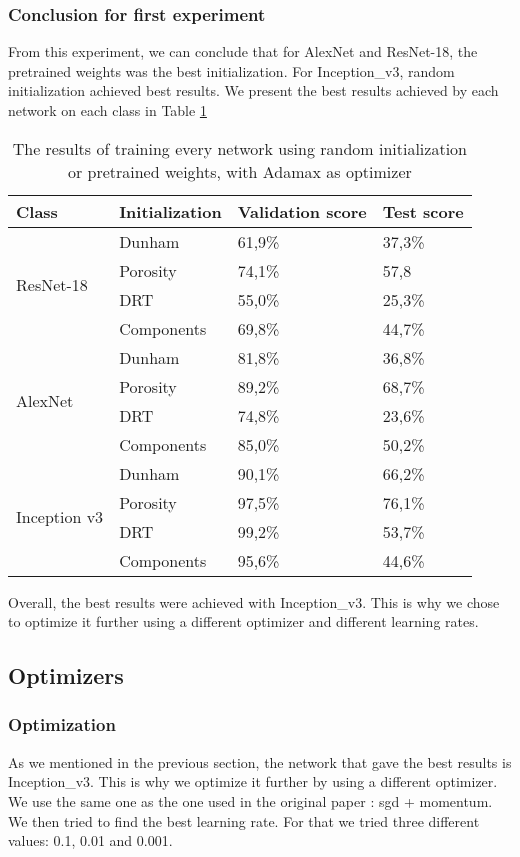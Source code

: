 \subsubsection{Conclusion for first experiment}
From this experiment, we can conclude that for AlexNet and ResNet-18, the pretrained weights was the best initialization. For Inception\_v3, random initialization achieved best results. We present the best results achieved by each network on each class in Table \ref{tab:finalinit}
\begin{table}
\caption[Best results for each network]{\label{tab:finalinit} The results of training every network using random initialization or pretrained weights, with Adamax as optimizer}
\centering
\begin{tabular}[b]{| l |  l | l | l |}
\hline
    Class & Initialization & Validation score  & Test score\\ \hline
    \multirow{4}{*}{ResNet-18} & Dunham &  61,9\%  & 37,3\% \\ 
    & Porosity & 74,1\% &  57,8\\
    &DRT & 55,0\% &  25,3\% \\
    &Components & 69,8\% &  44,7\% \\ \hline
     \multirow{4}{*}{AlexNet} & Dunham &  81,8\% & 36,8\% \\
    & Porosity & 89,2\% &  68,7\% \\
    &DRT & 74,8\% &   23,6\% \\
    &Components & 85,0\% & 50,2\% \\ \hline
    \multirow{4}{*}{Inception v3} & Dunham &  90,1\% & 66,2\% \\
    & Porosity & 97,5\% &  76,1\% \\
    &DRT & 99,2\% &  53,7\% \\
    &Components & 95,6\% & 44,6\% \\ \hline
\end{tabular} 
\end{table}

Overall, the best results were achieved with Inception\_v3. This is why we chose to optimize it further using a different optimizer and different learning rates. 


\subsection{Optimizers}
\subsubsection{Optimization}
As we mentioned in the previous section, the network that gave the best results is Inception\_v3.
This is why we optimize it further by using a different optimizer. We use the same one as the one used in the original paper \cite{googlepaper}: \gls{sgd} + momentum. We then tried to find the best learning rate. For that we tried three different values: 0.1, 0.01 and 0.001.

